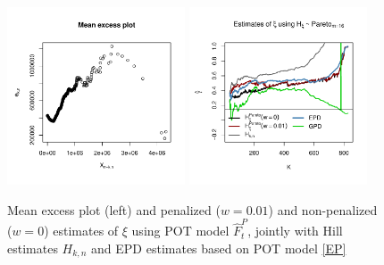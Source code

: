\documentclass[a4paper,11pt]{article}
\begin{document}
\begin{figure}[!ht]
  \centering
 \includegraphics[width=0.47\textwidth]{CY2_MeanExcess.pdf}
 \includegraphics[width=0.47\textwidth]{xi_m16.pdf}        
\caption{\small Mean excess plot (left) and penalized ($w=0.01$) and non-penalized ($w=0$) estimates of $\xi$ using POT model $\hat{F}^{P}_t$, jointly with Hill estimates $H_{k,n}$ and EPD estimates based on POT model \eqref{EP}} 
 \end{figure}
\end{document}

